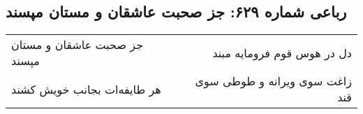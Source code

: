 \begin{center}
\section*{رباعی شماره ۶۲۹: جز صحبت عاشقان و مستان مپسند}
\label{sec:0629}
\begin{longtable}{l p{0.5cm} r}
جز صحبت عاشقان و مستان مپسند
&&
دل در هوس قوم فرومایه مبند
\\
هر طایفه‌ات بجانب خویش کشند
&&
زاغت سوی ویرانه و طوطی سوی قند
\\
\end{longtable}
\end{center}
